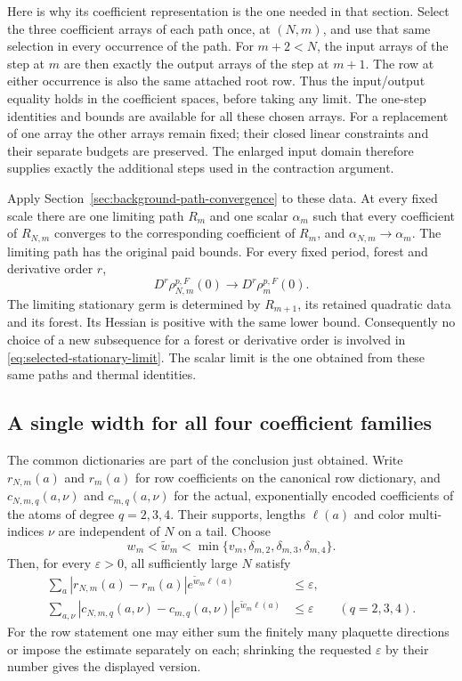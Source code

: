 Here is why its coefficient representation is the one needed in that
section. Select the three coefficient arrays of each path once, at
$(N,m)$, and use that same selection in every occurrence of the path.
For $m+2<N$, the input arrays of the step at $m$ are then exactly the
output arrays of the step at $m+1$. The row at either occurrence is
also the same attached root row. Thus the input/output equality holds
in the coefficient spaces, before taking any limit. The one-step
identities and bounds are available for all these chosen arrays.
For a replacement of one array the other arrays remain fixed; their
closed linear constraints and their separate budgets are preserved.
The enlarged input domain therefore supplies exactly the additional
steps used in the contraction argument.

Apply Section~\ref{sec:background-path-convergence} to these data.
At every fixed scale there are one limiting path $R_m$ and one
scalar $\alpha_m$ such that every coefficient of $R_{N,m}$ converges
to the corresponding coefficient of $R_m$, and
$\alpha_{N,m}\to\alpha_m$. The limiting path has the original paid
bounds. For every fixed period, forest and derivative order $r$,
\begin{equation}\label{eq:selected-stationary-limit}
 D^r\rho_{N,m}^{p,F}(0)\longrightarrow D^r\rho_m^{p,F}(0).
\end{equation}
The limiting stationary germ is determined by $R_{m+1}$, its retained
quadratic data and its forest. Its Hessian is positive with the same
lower bound. Consequently no choice of a new subsequence for a forest
or derivative order is involved in \eqref{eq:selected-stationary-limit}.
The scalar limit is the one obtained from these same paths and thermal
identities.

\subsection{A single width for all four coefficient families}
The common dictionaries are part of the conclusion just obtained.
Write $r_{N,m}(a)$ and $r_m(a)$ for row coefficients on the canonical
row dictionary, and $c_{N,m,q}(a,\nu)$ and $c_{m,q}(a,\nu)$ for the
actual, exponentially encoded coefficients of the atoms of degree
$q=2,3,4$. Their supports, lengths $\ell(a)$ and color multi-indices
$\nu$ are independent of $N$ on a tail. Choose
\[
 w_m<\widetilde w_m<
 \min\{v_m,\delta_{m,2},\delta_{m,3},\delta_{m,4}\}.
\]
Then, for every $\varepsilon>0$, all sufficiently large $N$ satisfy
\begin{align}
 \sum_a |r_{N,m}(a)-r_m(a)|e^{\widetilde w_m\ell(a)}
       &\le\varepsilon,\label{eq:selected-row-width}\\
 \sum_{a,\nu}|c_{N,m,q}(a,\nu)-c_{m,q}(a,\nu)|
                         e^{\widetilde w_m\ell(a)}
       &\le\varepsilon\qquad(q=2,3,4).
 \label{eq:selected-atom-width}
\end{align}
For the row statement one may either sum the finitely many plaquette
directions or impose the estimate separately on each; shrinking the
requested $\varepsilon$ by their number gives the displayed version.

